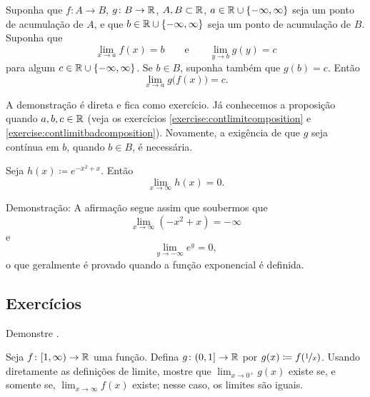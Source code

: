 \begin{prop} \label{prop:inflimcompositions}
Suponha que $f \colon A \to B$, $g \colon B \to {\mathbb{R}}$, $A, B \subset {\mathbb{R}}$,
$a \in {\mathbb{R}} \cup \{ -\infty, \infty\}$ seja um ponto de acumulação de $A$,
e que $b \in {\mathbb{R}} \cup \{ -\infty, \infty\}$ seja um ponto de acumulação de $B$.
Suponha que
\begin{equation*}
\lim_{x \to a} f(x) = b\qquad \text{e} \qquad \lim_{y \to b} g(y) = c
\end{equation*}
para algum $c \in {\mathbb{R}} \cup \{ -\infty, \infty \}$.
Se $b \in B$, suponha também que $g(b) = c$.
Então
\begin{equation*}
\lim_{x \to a} g\bigl(f(x)\bigr) = c .
\end{equation*}
\end{prop}

A demonstração é direta e fica como exercício. Já conhecemos a proposição quando $a, b, c \in {\mathbb{R}}$
(veja os exercícios
\ref{exercise:contlimitcomposition} e
\ref{exercise:contlimitbadcomposition}). Novamente, a exigência de que $g$ seja
contínua em $b$, quando $b \in B$, é necessária.

\begin{example}
Seja $h(x) \coloneqq e^{-x^2+x}$. Então
\begin{equation*}
\lim_{x\to \infty} h(x) = 0 .
\end{equation*}

Demonstração:
A afirmação segue assim que soubermos que
\begin{equation*}
\lim_{x\to \infty} (-x^2+x) = -\infty
\end{equation*}
e
\begin{equation*}
\lim_{y\to -\infty} e^y = 0 ,
\end{equation*}
o que geralmente é provado quando a função exponencial é definida.
\end{example}

\subsection{Exercícios}

\begin{exercise}
Demonstre .
\end{exercise}

\begin{exercise}
Seja $f \colon [1,\infty) \to {\mathbb{R}}$ uma função. Defina
$g \colon (0,1] \to {\mathbb{R}}$ por $g(x) \coloneqq f(\nicefrac{1}{x})$.
Usando diretamente as definições de limite,
mostre que $\lim_{x\to 0^+} g(x)$
existe se, e somente se, $\lim_{x\to \infty} f(x)$ existe; nesse
caso, os limites são iguais.
\end{exercise}

